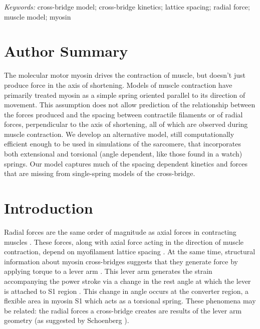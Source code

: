 \documentclass[10pt]{article}
\newcommand{\citep}[1]{\cite{#1}} %
\begin{document}
\emph{Keywords:} cross-bridge model; cross-bridge kinetics; lattice spacing; radial force; muscle model; myosin 


\section*{Author Summary} %
The molecular motor myosin drives the contraction of muscle, but doesn't just produce force in the axis of shortening.
Models of muscle contraction have primarily treated myosin as a simple spring oriented parallel to its direction of movement. 
This assumption does not allow prediction of the relationship between the forces produced and the spacing between contractile filaments or of radial forces, perpendicular to the axis of shortening, all of which are observed during muscle contraction. 
We develop an alternative model, still computationally efficient enough to be used in simulations of the sarcomere, that incorporates both extensional and torsional (angle dependent, like those found in a watch) springs. 
Our model captures much of the spacing dependent kinetics and forces that are missing from single-spring models of the cross-bridge.


\section*{Introduction} %

Radial forces are the same order of magnitude as axial forces in contracting muscles \citep{Maughan1981, Cecchi1990, Millman1998}. 
These forces, along with axial force acting in the direction of muscle contraction, depend on myofilament lattice spacing \citep{Bagni1994, Fuchs2005}. 
At the same time, structural information about myosin cross-bridges suggests that they generate force by applying torque to a lever arm \citep{Rayment1993, Uyeda1996, Huxley2000}.
This lever arm generates the strain accompanying the power stroke via a change in the rest angle at which the lever is attached to S1 region \citep{Huxley2000, Houdusse2001}. 
This change in angle occurs at the converter region, a flexible area in myosin S1 which acts as a torsional spring. 
These phenomena may be related: the radial forces a cross-bridge creates are results of the lever arm geometry (as suggested by Schoenberg \citep{Schoenberg1980b}). 
\end{document}
